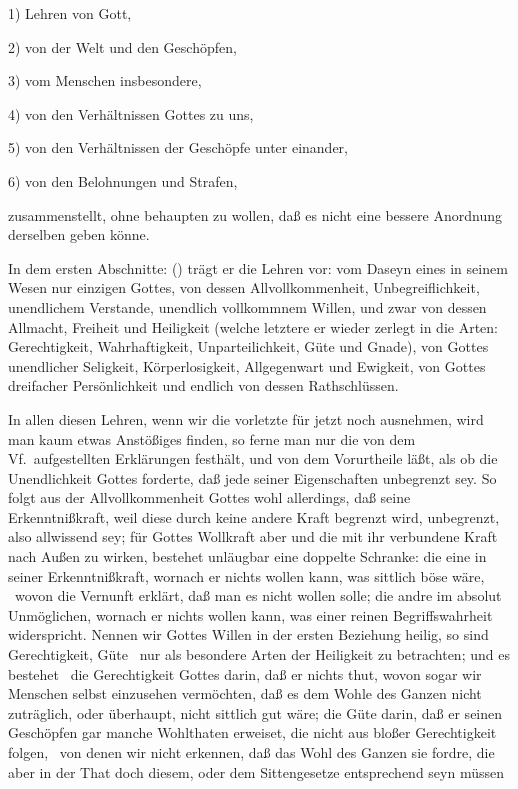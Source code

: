 1) Lehren von Gott, \par
2) von der Welt und den Geschöpfen, \par
3) vom Menschen insbesondere, \par
4) von den Verhältnissen Gottes zu uns, \par
5) von den Verhältnissen der Geschöpfe unter einander, \par
6) von den Belohnungen und Strafen, \par
zusammenstellt, ohne behaupten zu wollen, daß es nicht eine bessere Anordnung derselben geben könne. \par
In dem ersten Abschnitte:  () trägt er die Lehren vor: vom Daseyn eines in seinem Wesen nur einzigen Gottes, von dessen Allvollkommenheit, Unbegreiflichkeit, unendlichem Verstande, unendlich vollkommnem Willen, und zwar von dessen Allmacht, Freiheit und Heiligkeit (welche letztere er wieder zerlegt in die Arten: Gerechtigkeit, Wahrhaftigkeit, Unparteilichkeit, Güte und Gnade), von Gottes unendlicher Seligkeit, Körperlosigkeit, Allgegenwart und Ewigkeit, von Gottes dreifacher Persönlichkeit und endlich von dessen Rathschlüssen. \par 
In allen diesen Lehren, wenn wir die vorletzte für jetzt noch ausnehmen, wird man kaum etwas Anstößiges finden, so ferne man nur die von dem Vf.\ aufgestellten Erklärungen festhält, und von dem Vorurtheile läßt, als ob die Unendlichkeit Gottes forderte, daß jede seiner Eigenschaften  unbegrenzt sey. So folgt aus der Allvollkommenheit Gottes wohl allerdings, daß seine Erkenntnißkraft, weil diese durch keine andere Kraft begrenzt wird, unbegrenzt, also allwissend sey; für Gottes Wollkraft aber und die mit ihr verbundene Kraft nach Außen zu wirken, bestehet unläugbar eine doppelte Schranke: die eine in seiner Erkenntnißkraft, wornach er nichts wollen kann, was sittlich böse wäre, \dh\  wovon die Vernunft erklärt, daß man es nicht wollen solle; die andre im absolut Unmöglichen, wornach er nichts wollen kann, was einer reinen Begriffswahrheit widerspricht. Nennen wir Gottes Willen in der ersten Beziehung heilig, so sind Gerechtigkeit, Güte \usw\ nur als besondere Arten der Heiligkeit zu betrachten; und es bestehet \zB\ die Gerechtigkeit Gottes darin, daß er nichts thut, wovon sogar wir Menschen selbst einzusehen vermöchten, daß es dem Wohle des Ganzen nicht zuträglich, oder überhaupt, nicht sittlich gut wäre; die Güte darin, daß er seinen Geschöpfen gar manche Wohlthaten erweiset, die nicht aus bloßer Gerechtigkeit folgen, \dh\  von denen wir nicht erkennen, daß das Wohl des Ganzen sie fordre, die aber in der That doch diesem, oder dem Sittengesetze entsprechend seyn müssen \usw\ \par
